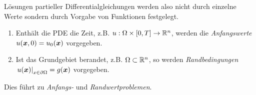 \documentclass{lecture}
\begin{document}
    Lösungen partieller Differentialgleichungen werden also nicht durch einzelne Werte sondern durch Vorgabe von Funktionen festgelegt.
    
    \begin{definition}
        \begin{enumerate}
            \item Enthält die PDE die Zeit, z.B. \(u: \Omega \times \brackets*{0, T} \to \R^n\), werden die \emph{Anfangswerte} \(u\parentheses*{\bm{x}, 0} = u_0\parentheses*{\bm{x}}\) vorgegeben.
            \item Ist das Grundgebiet berandet, z.B. \(\Omega \subset \R^n\), so werden \emph{Randbedingungen} \(\left.u\parentheses*{\bm{x}}\right|_{x \in \partial\Omega} = g\parentheses*{\bm{x}}\) vorgegeben.
        \end{enumerate}
        Dies führt zu \emph{Anfangs-} und \emph{Randwertproblemen}.
    \end{definition}
\end{document}
